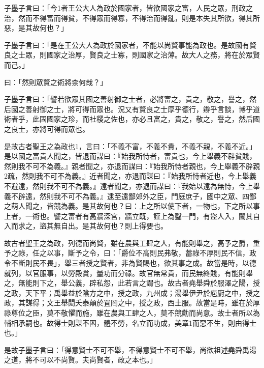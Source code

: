 
\begin{pinyinscope}
子墨子言曰：「今1者王公大人為政於國家者，皆欲國家之富，人民之眾，刑政之治，然而不得富而得貧，不得眾而得寡，不得治而得亂，則是本失其所欲，得其所惡，是其故何也？」

子墨子言曰：「是在王公大人為政於國家者，不能以尚賢事能為政也。是故國有賢良之士眾，則國家之治厚，賢良之士寡，則國家之治薄。故大人之務，將在於眾賢而己。」

曰：「然則眾賢之術將柰何哉？」

子墨子言曰：「譬若欲眾其國之善射御之士者，必將富之，貴之，敬之，譽之，然后國之善射御之士，將可得而眾也。況又有賢良之士厚乎德行，辯乎言談，博乎道術者乎，此固國家之珍，而社稷之佐也，亦必且富之，貴之，敬之，譽之，然后國之良士，亦將可得而眾也。

是故古者聖王之為政也1，言曰：「不義不富，不義不貴，不義不親，不義不近。」是以國之富貴人聞之，皆退而謀曰：『始我所恃者，富貴也，今上舉義不辟貧賤，然則我不可不為義。』親者聞之，亦退而謀曰：『始我所恃者親也，今上舉義不辟親2疏，然則我不可不為義。』近者聞之，亦退而謀曰：『始我所恃者近也，今上舉義不避遠，然則我不可不為義。』遠者聞之，亦退而謀曰：『我始以遠為無恃，今上舉義不辟遠，然則我不可不為義。』逮至遠鄙郊外之臣，門庭庶子，國中之眾、四鄙之萌人聞之，皆競為義。是其故何也？曰：上之所以使下者，一物也，下之所以事上者，一術也。譬之富者有高牆深宮，牆立既，謹上為鑿一門，有盜人入，闔其自入而求之，盜其無自出。是其故何也？則上得要也。

故古者聖王之為政，列德而尚賢，雖在農與工肆之人，有能則舉之，高予之爵，重予之祿，任之以事，斷予之令，曰：「爵位不高則民弗敬，蓄祿不厚則民不信，政令不斷則民不畏」，舉三者授之賢者，非為賢賜也，欲其事之成。故當是時，以德就列，以官服事，以勞殿賞，量功而分祿。故官無常貴，而民無終賤，有能則舉之，無能則下之，舉公義，辟私怨，此若言之謂也。故古者堯舉舜於服澤之陽，授之政，天下平；禹舉益於陰方之中，授之政，九州成；湯舉伊尹於庖廚之中，授之政，其謀得；文王舉閎夭泰顛於罝罔之中，授之政，西土服。故當是時，雖在於厚祿尊位之臣，莫不敬懼而施，雖在農與工肆之人，莫不競勸而尚意。故士者所以為輔相承嗣也。故得士則謀不困，體不勞，名立而功成，美章1而惡不生，則由得士也。」

是故子墨子言曰：「得意賢士不可不舉，不得意賢士不可不舉，尚欲祖述堯舜禹湯之道，將不可以不尚賢。夫尚賢者，政之本也。」


\end{pinyinscope}